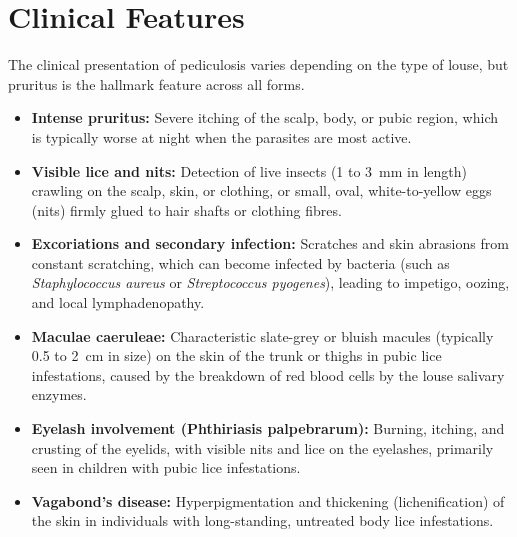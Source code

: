 \section*{Clinical Features}
The clinical presentation of pediculosis varies depending on the type of louse, but pruritus is the hallmark feature across all forms.
\begin{itemize}
    \item \textbf{Intense pruritus:} Severe itching of the scalp, body, or pubic region, which is typically worse at night when the parasites are most active.
    \item \textbf{Visible lice and nits:} Detection of live insects (1 to 3~mm in length) crawling on the scalp, skin, or clothing, or small, oval, white-to-yellow eggs (nits) firmly glued to hair shafts or clothing fibres.
    \item \textbf{Excoriations and secondary infection:} Scratches and skin abrasions from constant scratching, which can become infected by bacteria (such as \textit{Staphylococcus aureus} or \textit{Streptococcus pyogenes}), leading to impetigo, oozing, and local lymphadenopathy.
    \item \textbf{Maculae caeruleae:} Characteristic slate-grey or bluish macules (typically 0.5 to 2~cm in size) on the skin of the trunk or thighs in pubic lice infestations, caused by the breakdown of red blood cells by the louse salivary enzymes.
    \item \textbf{Eyelash involvement (Phthiriasis palpebrarum):} Burning, itching, and crusting of the eyelids, with visible nits and lice on the eyelashes, primarily seen in children with pubic lice infestations.
    \item \textbf{Vagabond's disease:} Hyperpigmentation and thickening (lichenification) of the skin in individuals with long-standing, untreated body lice infestations.
\end{itemize}


